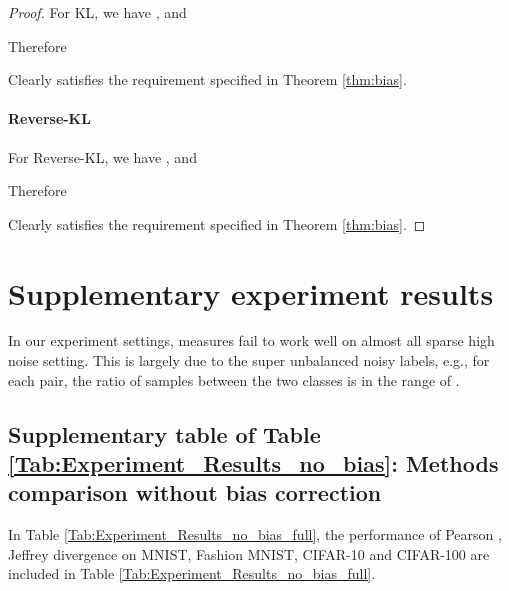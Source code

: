 \documentclass{article}
\begin{document}
\begin{proof}
For KL, we have , and 


Therefore 

Clearly  satisfies the requirement specified in Theorem \ref{thm:bias}.


\paragraph{Reverse-KL}

For Reverse-KL, we have , and 


Therefore 

Clearly  satisfies the requirement specified in Theorem \ref{thm:bias}.

\end{proof}





 
\section{Supplementary experiment results}
In our experiment settings,  measures fail to work well on almost all sparse high noise setting. This is largely due to the super unbalanced noisy labels, e.g., for each pair, the ratio of samples between the two classes is in the range of . 
\subsection{Supplementary table of Table \ref{Tab:Experiment_Results_no_bias}: Methods comparison without bias correction}
In Table \ref{Tab:Experiment_Results_no_bias_full}, the performance of Pearson , Jeffrey divergence on MNIST, Fashion MNIST, CIFAR-10 and CIFAR-100 are included in Table \ref{Tab:Experiment_Results_no_bias_full}.
\end{document}
